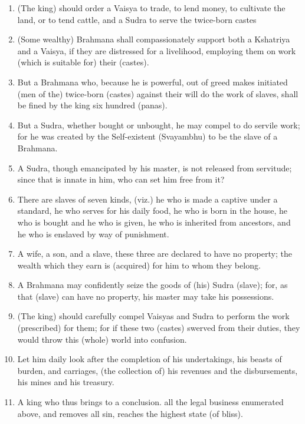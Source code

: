 \begin{enumerate}
\item (The king) should order a Vaisya to trade, to lend money, to cultivate the land, or to tend cattle, and a Sudra to serve the twice-born castes
\item (Some wealthy) Brahmana shall compassionately support both a Kshatriya and a Vaisya, if they are distressed for a livelihood, employing them on work (which is suitable for) their (castes).
\item But a Brahmana who, because he is powerful, out of greed makes initiated (men of the) twice-born (castes) against their will do the work of slaves, shall be fined by the king six hundred (panas).
\item But a Sudra, whether bought or unbought, he may compel to do servile work; for he was created by the Self-existent (Svayambhu) to be the slave of a Brahmana.
\item A Sudra, though emancipated by his master, is not released from servitude; since that is innate in him, who can set him free from it?
\item There are slaves of seven kinds, (viz.) he who is made a captive under a standard, he who serves for his daily food, he who is born in the house, he who is bought and he who is given, he who is inherited from ancestors, and he who is enslaved by way of punishment.
\item A wife, a son, and a slave, these three are declared to have no property; the wealth which they earn is (acquired) for him to whom they belong.
\item A Brahmana may confidently seize the goods of (his) Sudra (slave); for, as that (slave) can have no property, his master may take his possessions.
\item (The king) should carefully compel Vaisyas and Sudra to perform the work (prescribed) for them; for if these two (castes) swerved from their duties, they would throw this (whole) world into confusion.
\item Let him daily look after the completion of his undertakings, his beasts of burden, and carriages, (the collection of) his revenues and the disbursements, his mines and his treasury.
\item A king who thus brings to a conclusion. all the legal business enumerated above, and removes all sin, reaches the highest state (of bliss).
\end{enumerate}
